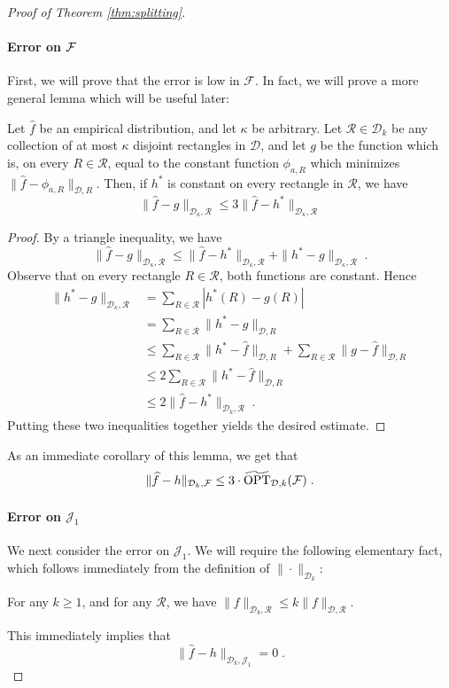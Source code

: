 \documentclass[final,12pt]{colt2018} %
\newcommand{\rect}{\mathcal{R}}
\newcommand{\hier}{\mathcal{D}}
\newcommand{\calF}{\mathcal{F}}
\newcommand{\calJ}{\mathcal{J}}
\newcommand{\fhat}{\widehat{f}}
\newcommand{\tOPT}{\widetilde{\OPT}}
\begin{document}
\begin{proof}[Proof of Theorem \ref{thm:splitting}]
\paragraph{Error on $\cal{F}$}
First, we will prove that the error is low in $\calF$.
In fact, we will prove a more general lemma which will be useful later:
\begin{lemma}
\label{lem:flat-err}
Let $\fhat$ be an empirical distribution, and let $\kappa$ be arbitrary.
Let $\rect \in \hier_k$ be any collection of at most $\kappa$ disjoint rectangles in $\hier$, and let $g$ be the function which is, on every $R \in \rect$, equal to the constant function $\phi_{a, R}$ which minimizes $\| \fhat - \phi_{a, R} \|_{\hier, R}$.
Then, if $h^*$ is constant on every rectangle in $\rect$, we have
\[
\| \fhat - g \|_{\hier_{\kappa}, \rect} \leq 3 \| \fhat - h^* \|_{\hier_{\kappa}, \rect}
\]
\end{lemma}
\begin{proof}
By a triangle inequality, we have 
\[
\| \fhat - g \|_{\hier_{\kappa}, \rect} \leq \| \fhat - h^* \|_{\hier_{\kappa}, \rect} + \| h^* - g \|_{\hier_{\kappa}, \rect} \; .
\]
Observe that on every rectangle $R \in \rect$, both functions are constant.
Hence
\begin{align*}
\| h^* - g \|_{\hier_{\kappa}, \rect} &= \sum_{R \in \rect} |h^* (R) - g (R)| \\
&= \sum_{R \in \rect} \| h^* - g \|_{\hier, R}  \\
&\leq \sum_{R \in \rect} \| h^* - \fhat \|_{\hier, R} + \sum_{R \in \rect} \| g - \fhat \|_{\hier, R} \\
&\leq 2 \sum_{R \in \rect} \| h^* - \fhat \|_{\hier, R} \\
&\leq 2 \| \fhat - h^* \|_{\hier_k, \rect} \; .
\end{align*}
Putting these two inequalities together yields the desired estimate.
\end{proof}
As an immediate corollary of this lemma, we get that
\begin{equation}
\label{eq:err-F}
\| \fhat - h \|_{\hier_k, \calF} \leq 3 \cdot \tOPT_{\hier, k} (\calF) \; .
\end{equation}

\paragraph{Error on $\calJ_1$}
We next consider the error on $\calJ_1$.
We will require the following elementary fact, which follows immediately from the definition of $\| \cdot \|_{\hier_k}$:
\begin{fact}
\label{fact:A1-to-Ak}
For any $k \geq 1$, and for any $\rect$, we have $\| f \|_{\hier_k, \rect} \leq k \| f \|_{\hier, \rect}$.
\end{fact}
This immediately implies that 
\begin{equation}
\label{eq:err-J1}
\| \fhat - h \|_{\hier_k, \calJ_1} = 0 \; .
\end{equation}


\end{proof}
\end{document}
